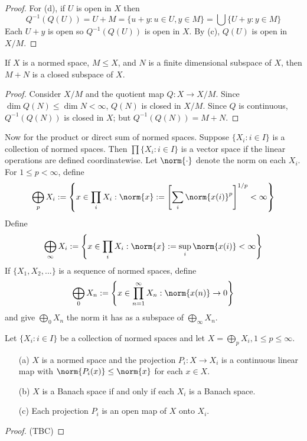 \begin{proof}
    For (d), if $U$ is open in $X$ then $$Q^{-1}(Q(U)) = U+M = \{u+y : u \in U,y \in M\} = \bigcup\{U+y:y \in M\}$$
    Each $U + y$ is open so $Q^{-1}(Q(U))$ is open in $X$. By (c), $Q(U)$ is open in $X/M$.
\end{proof}


\begin{prop}
    If $X$ is a normed space, $M \leq X$, and $N$ is a finite dimensional subspace of $X$, then $M+N$ is a closed subspace of $X$.
\end{prop}
\begin{proof}
    Consider $X/M$ and the quotient map $Q:X\rightarrow X/M$. Since $\dim Q(N) \leq \dim N < \infty$, $Q(N)$ is closed in $X/M$. Since $Q$ is continuous, $Q^{-1}(Q(N))$ is closed in $X$; but $Q^{-1}(Q(N)) = M+N$.
\end{proof}

Now for the product or direct sum of normed spaces. Suppose $\{X_i:i \in I\}$ is a collection of normed spaces. Then $\prod\{X_i:i \in I\}$ is a vector space if the linear operations are defined coordinatewise. Let $\norm{\cdot}$ denote the norm on each $X_i$. For $1 \leq p < \infty$, define $$\bigoplus_pX_i := \left\{x \in \prod_iX_i:\norm{x} := \left[\sum_{i}\norm{x(i)}^p\right]^{1/p} < \infty\right\}$$
Define $$\bigoplus_{\infty}X_i := \left\{x \in \prod_iX_i:\norm{x} := \sup_i\norm{x(i)} <\infty\right\}$$
If $\{X_1,X_2,...\}$ is a sequence of normed spaces, define $$\bigoplus_0X_n := \left\{x \in \prod_{n=1}^{\infty}X_n:\norm{x(n)}\rightarrow 0\right\}$$
and give $\bigoplus_0X_n$ the norm it has as a subspace of $\bigoplus_{\infty}X_n$.


\begin{prop}
    Let $\{X_i:i \in I\}$ be a collection of normed spaces and let $X = \bigoplus_p X_i, 1 \leq p \leq \infty$. \begin{enumerate}
        \item[(a)] $X$ is a normed space and the projection $P_i:X\rightarrow X_i$ is a continuous linear map with $\norm{P_i(x)} \leq \norm{x}$ for each $x \in X$.
        \item[(b)] $X$ is a Banach space if and only if each $X_i$ is a Banach space.
        \item[(c)] Each projection $P_i$ is an open map of $X$ onto $X_i$.
    \end{enumerate}
\end{prop}
\begin{proof}
    (TBC)
\end{proof}




